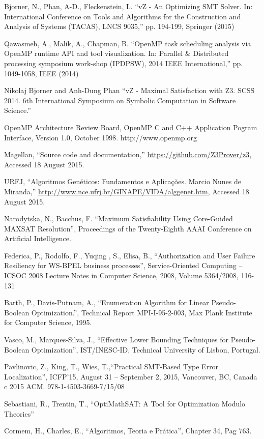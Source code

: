 \begin{thebibliography}{5}
Bjorner, N., Phan, A-D., Fleckenstein, L. ``{vZ - An Optimizing SMT Solver. In: International Conference on Tools and Algorithms for the Construction and Analysis of Systems (TACAS), LNCS 9035},'' pp. 194-199, Springer (2015)

Qawasmeh, A., Malik, A., Chapman, B. ``{OpenMP task scheduling analysis via OpenMP runtime API and tool visualization. In: Parallel \& Distributed processing symposium work-shop (IPDPSW), 2014 IEEE International},'' pp. 1049-1058, IEEE (2014)

Nikolaj Bjorner and Anh-Dung Phan ``{vZ - Maximal Satisfaction with Z3. SCSS 2014. 6th International Symposium on Symbolic Computation in Software Science.}''

OpenMP Architecture Review Board, OpenMP C and C++
Application Pogram Interface, Version 1.0, October 1998.
http://www.openmp.org

Magellan, ``{Source code and documentation},''
  \url{https://github.com/Z3Prover/z3}, Accessed 18 August 2015.
  
URFJ, ``{Algoritmos Genéticos: Fundamentos e Aplicações. Marcio Nunes de Miranda},''
  \url{http://www.nce.ufrj.br/GINAPE/VIDA/alggenet.htm}, Accessed 18 August 2015.

Narodytska, N., Bacchus, F. {``Maximum Satisfiability Using Core-Guided MAXSAT Resolution'', Proceedings of the Twenty-Eighth AAAI Conference on Artificial Intelligence.}

Federica, P., Rodolfo, F., Yuqing , S., Elisa, B., {``Authorization and User Failure Resiliency for WS-BPEL business processes''}, Service-Oriented Computing – ICSOC 2008 Lecture Notes in Computer Science, 2008, Volume 5364/2008, 116-131

Barth, P., Davis-Putnam, A., {``Enumeration Algorithm for Linear
Pseudo-Boolean Optimization.''}, Technical Report MPI-I-95-2-003, Max Plank Institute for Computer Science, 1995.

Vasco, M., Marques-Silva, J., {``Effective Lower Bounding Techniques for Pseudo-Boolean Optimization''}, IST/INESC-ID, Technical University of Lisbon, Portugal.

Pavlinovic, Z., King, T., Wies, T.,{``Practical SMT-Based Type Error Localization''}, ICFP’15, August 31 – September 2, 2015, Vancouver, BC, Canada c 2015 ACM. 978-1-4503-3669-7/15/08

Sebastiani, R., Trentin, T., {``OptiMathSAT: A Tool for Optimization Modulo Theories''}

Cormem, H., Charles, E., {``Algoritmos, Teoria e Prática''}, Chapter 34, Pag 763.

\end{thebibliography}




